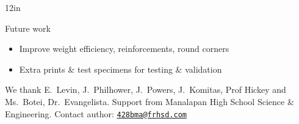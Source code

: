 \documentclass[pdf]{beamer}
\begin{document}
\begin{frame}{}
\begin{columns}[T,totalwidth=\textwidth]
\begin{column}{12in}
\begin{minipage}[t][\textheight]{\linewidth}
\begin{block}{Future work}
\begin{itemize}
\item Improve weight efficiency, reinforcements, round corners
\item Extra prints \& test specimens for testing \& validation
\end{itemize}
\end{block}
\vfill
\begin{block}{} %
We thank E.~Levin, J.~Philhower, J.~Powers, J.~Komitas, Prof Hickey and Ms.~Botei, Dr.~Evangelista. Support from Manalapan High School Science \& Engineering. Contact author: \href{mailto:428bma@frhsd.com}{\texttt{428bma@frhsd.com}}
\end{block}
\vfill*
\end{minipage}
\end{column}
\end{columns}
\end{frame}
\end{document}
